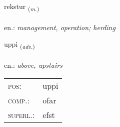 \documentclass[frontgrid, backgrid]{flacards}\usepackage[]{graphicx}\usepackage[]{xcolor}
\begin{document}
\renewcommand{\blhead}{\vskip5pt {\small\bfseries\footnotesize Nafnorð | Noun }}
\renewcommand{\bcfoot}{\vskip5pt \hspace{2pt}{\small\bfseries\footnotesize 1K}}


{rekstur \small{\textsubscript{(\textit{m.})}} \\[1ex] %
\textphonetic{[rɛkstʏr]} \\
en.: \emph{management, operation; herding} \\  [2ex]
\renewcommand*{\arraystretch}{0.8}
}

\renewcommand{\flhead}{\vskip5pt \fboxsep=0pt {\small\bfseries\footnotesize Atviksorð | Adverb}}
\renewcommand{\fcfoot}{\vskip5pt \fboxsep=0pt \hspace{2pt}{\small\bfseries\footnotesize 1K}}

\renewcommand{\blhead}{\vskip5pt {\small\bfseries\footnotesize Atviksorð | Adverb }}
\renewcommand{\bcfoot}{\vskip5pt \hspace{2pt}{\small\bfseries\footnotesize 1K}}


{uppi \small{\textsubscript{(\textit{adv.})}} \\[1ex] %
\textphonetic{[ʏhpɪ]} \\
en.: \emph{above, upstairs} \\  [2ex]
\renewcommand*{\arraystretch}{0.8}
\begin{tabular}{ll}
\textsc{pos}: & uppi \\ 
\textsc{comp.}: & ofar \\ 
\textsc{superl.}: & efst \\
\end{tabular}
}

\renewcommand{\flhead}{\vskip5pt \fboxsep=0pt {\small\bfseries\footnotesize Nafnorð | Noun}}
\renewcommand{\fcfoot}{\vskip5pt \fboxsep=0pt \hspace{2pt}{\small\bfseries\footnotesize 1K}}
\end{document}
